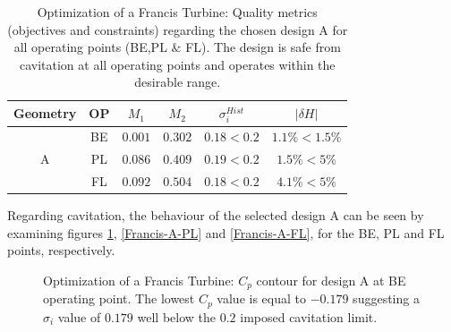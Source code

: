 \begin{table}[h!]
\begin{center}
\begin{tabular}{ |c|c|c|c|c|c| }
\hline
Geometry & OP & $M_1$ & $M_2$  & $\sigma_i^{Hist}$ & $|\delta H|$\\
\hline
& BE & $0.001$ & $0.302$ & $0.18 < 0.2$ & $ 1.1\% <1.5\%$ \\
A & PL & $0.086$ & $0.409$ & $0.19 < 0.2$ & $ 1.5\% <5\%$ \\
& FL & $0.092$ & $0.504$ & $0.18 < 0.2$ & $ 4.1\% <5\%$  \\
\hline
\end{tabular}
\caption{Optimization of a Francis Turbine: Quality metrics (objectives and constraints) regarding the chosen design A for all operating points (BE,PL $\&$ FL). The design is safe from cavitation at all operating points and operates within the desirable range.}
\label{Asum}
\end{center}
\end{table} 

Regarding cavitation, the behaviour of the selected design A can be seen by examining figures \ref{Francis-A-BE}, \ref{Francis-A-PL} and \ref{Francis-A-FL}, for the BE, PL and FL points, respectively.      


\begin{figure}[h!]
\begin{minipage}[b]{1\linewidth}
 \centering
\end{minipage}
\caption{Optimization of a Francis Turbine: $C_p$ contour for design A at BE operating point. The lowest $C_p$ value is equal to $-0.179$ suggesting a $\sigma_i$ value of $0.179$ well below the $0.2$  imposed cavitation limit.}
\label{Francis-A-BE}
\end{figure}

